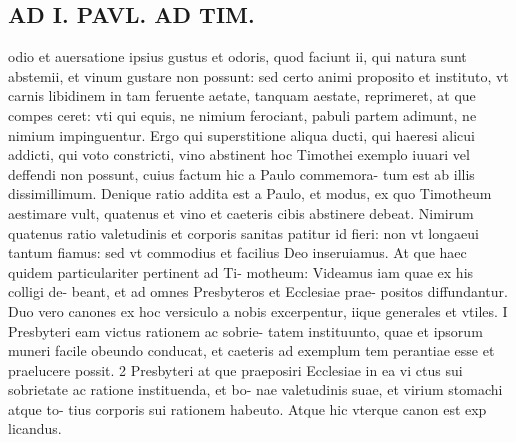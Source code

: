 \documentclass{article}
\begin{document}
\begin{pages}
\section*{AD I. PAVL. AD TIM. }\pstart odio et auersatione ipsius gustus et odoris, quod faciunt ii, qui natura sunt abstemii, et vinum gustare non possunt: sed certo animi proposito et instituto, vt carnis libidinem in tam feruente aetate, tanquam aestate, reprimeret, at que compes ceret: vti qui equis, ne nimium ferociant, pabuli partem adimunt, ne nimium impinguentur. Ergo qui superstitione aliqua ducti, qui haeresi alicui addicti, qui voto constricti, vino abstinent hoc Timothei exemplo iuuari vel deffendi non possunt, cuius factum hic a Paulo commemora- tum est ab illis dissimillimum. Denique ratio addita est a Paulo, et modus, ex quo Timotheum aestimare vult, quatenus et vino et caeteris cibis abstinere debeat. Nimirum quatenus ratio valetudinis et corporis sanitas patitur id fieri: non vt longaeui tantum fiamus: sed vt commodius et facilius Deo inseruiamus. At que haec quidem particulariter pertinent ad Ti- motheum: Videamus iam quae ex his colligi de- beant, et ad omnes Presbyteros et Ecclesiae prae- positos diffundantur. Duo vero canones ex hoc versiculo a nobis excerpentur, iique generales et vtiles. I Presbyteri eam victus rationem ac sobrie- tatem instituunto, quae et ipsorum muneri facile obeundo conducat, et caeteris ad exemplum tem perantiae esse et praelucere possit. 2 Presbyteri at que praeposiri Ecclesiae in ea vi ctus sui sobrietate ac ratione instituenda, et bo- nae valetudinis suae, et virium stomachi atque to- tius corporis sui rationem habeuto. Atque hic vterque canon est exp licandus.  \pend

\end{pages}
\end{document}

